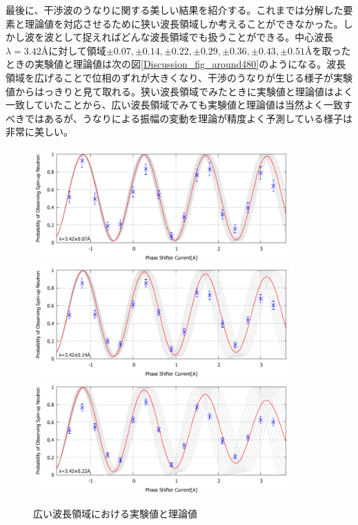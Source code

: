最後に、干渉波のうなりに関する美しい結果を紹介する。これまでは分解した要素と理論値を対応させるために狭い波長領域しか考えることができなかった。しかし波を波として捉えればどんな波長領域でも扱うことができる。中心波長$\lambda=3.42$\AA に対して領域$\pm 0.07, \pm0.14, \pm0.22, \pm0.29, \pm0.36, \pm0.43, \pm0.51$\AA を取ったときの実験値と理論値は次の図\ref{Discussion_fig_around480}のようになる。波長領域を広げることで位相のずれが大きくなり、干渉のうなりが生じる様子が実験値からはっきりと見て取れる。狭い波長領域でみたときに実験値と理論値はよく一致していたことから、広い波長領域でみても実験値と理論値は当然よく一致すべきではあるが、うなりによる振幅の変動を理論が精度よく予測している様子は非常に美しい。
\vspace{1cm}
\begin{figure}[H]
\centering
\includegraphics[width=10cm]{discussion/SEA/IT_480_10.pdf}
\includegraphics[width=10cm]{discussion/SEA/IT_480_20.pdf}
\includegraphics[width=10cm]{discussion/SEA/IT_480_30.pdf}
\caption{広い波長領域における実験値と理論値}
\end{figure}
